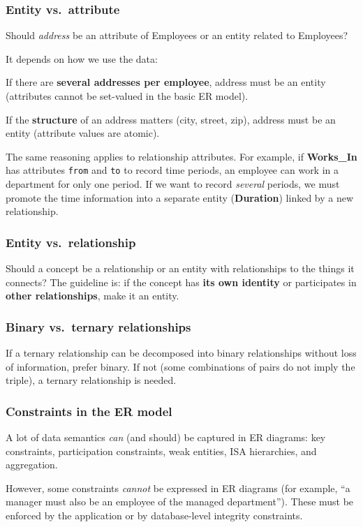 \documentclass[../../dis.tex]{subfiles}
\begin{document}
\subsubsection*{Entity vs.\ attribute}
Should \textit{address} be an attribute of Employees or an entity related to Employees?

It depends on how we use the data:
\begin{dashlist}
    \item If there are \textbf{several addresses per employee}, address must be an entity (attributes cannot be set-valued in the basic ER model).
    \item If the \textbf{structure} of an address matters (city, street, zip), address must be an entity (attribute values are atomic).
\end{dashlist}

The same reasoning applies to relationship attributes. For example, if \textbf{Works\_In} has attributes \texttt{from} and \texttt{to} to record time periods, an employee can work in a department for only one period. If we want to record \emph{several} periods, we must promote the time information into a separate entity (\textbf{Duration}) linked by a new relationship.

\subsubsection*{Entity vs.\ relationship}
Should a concept be a relationship or an entity with relationships to the things it connects? The guideline is: if the concept has \textbf{its own identity} or participates in \textbf{other relationships}, make it an entity.

\subsubsection*{Binary vs.\ ternary relationships}
If a ternary relationship can be decomposed into binary relationships without loss of information, prefer binary. If not (some combinations of pairs do not imply the triple), a ternary relationship is needed.

\subsubsection*{Constraints in the ER model}
\begin{dashlist}
    \item A lot of data semantics \emph{can} (and should) be captured in ER diagrams: key constraints, participation constraints, weak entities, ISA hierarchies, and aggregation.
    \item However, some constraints \emph{cannot} be expressed in ER diagrams (for example, ``a manager must also be an employee of the managed department''). These must be enforced by the application or by database-level integrity constraints.
\end{dashlist}
\end{document}
